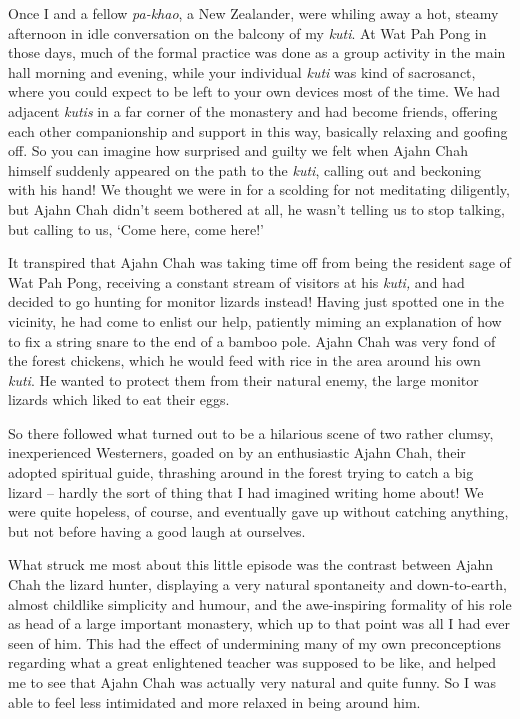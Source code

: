 Once I and a fellow \emph{pa-khao}, a New Zealander, were whiling away a
hot, steamy afternoon in idle conversation on the balcony of my
\emph{kuti}. At Wat Pah Pong in those days, much of the formal practice
was done as a group activity in the main hall morning and evening, while
your individual \emph{kuti} was kind of sacrosanct, where you could
expect to be left to your own devices most of the time. We had adjacent
\emph{kutis} in a far corner of the monastery and had become friends, 
offering each other companionship and support in this way, basically
relaxing and goofing off. So you can imagine how surprised and guilty we
felt when Ajahn Chah himself suddenly appeared on the path to the
\emph{kuti}, calling out and beckoning with his hand! We thought we were
in for a scolding for not meditating diligently, but Ajahn Chah didn't
seem bothered at all, he wasn't telling us to stop talking, but calling
to us, `Come here, come here!'

It transpired that Ajahn Chah was taking time off from being the
resident sage of Wat Pah Pong, receiving a constant stream of visitors
at his \emph{kuti,} and had decided to go hunting for monitor lizards
instead! Having just spotted one in the vicinity, he had come to enlist
our help, patiently miming an explanation of how to fix a string snare
to the end of a bamboo pole. Ajahn Chah was very fond of the forest
chickens, which he would feed with rice in the area around his own
\emph{kuti}. He wanted to protect them from their natural enemy, the
large monitor lizards which liked to eat their eggs. 

So there followed what turned out to be a hilarious scene of two rather
clumsy, inexperienced Westerners, goaded on by an enthusiastic Ajahn
Chah, their adopted spiritual guide, thrashing around in the forest
trying to catch a big lizard -- hardly the sort of thing that I had
imagined writing home about! We were quite hopeless, of course, and
eventually gave up without catching anything, but not before having a
good laugh at ourselves. 

What struck me most about this little episode was the contrast between
Ajahn Chah the lizard hunter, displaying a very natural spontaneity and
down-to-earth, almost childlike simplicity and humour, and the
awe-inspiring formality of his role as head of a large important
monastery, which up to that point was all I had ever seen of him. This
had the effect of undermining many of my own preconceptions regarding
what a great enlightened teacher was supposed to be like, and helped me
to see that Ajahn Chah was actually very natural and quite funny. So I
was able to feel less intimidated and more relaxed in being around him. 

